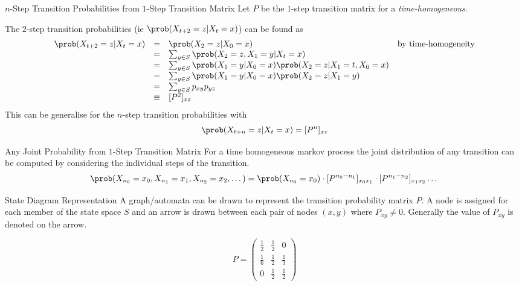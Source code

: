 \documentclass[11pt,a4paper]{article}
\begin{document}
  \begin{proposition}{$n$-Step Transition Probabilities from $1$-Step Transition Matrix}
    Let $P$ be the $1$-step transition matrix for a \textit{time-homogeneous}.

    \par The $2$-step transition probabilities (ie $\prob(X_{t+2}=z|X_t=x)$) can be found as
    \[\begin{array}{rcll}
      \prob(X_{t+2}=z|X_t=x)&=&\prob(X_2=z|X_0=x)&\text{by time-homogeneity}\\
      &=&\sum_{y\in S}\prob(X_2=z,X_1=y|X_t=x)\\
      &=&\sum_{y\in S}\prob(X_1=y|X_0=x)\prob(X_2=z|X_1=t,X_0=x)\\
      &=&\sum_{y\in S}\prob(X_1=y|X_0=x)\prob(X_2=z|X_1=y)\\
      &=&\sum_{y\in S}p_{xy}p_{yz}\\
      &\equiv&[P^2]_{xz}
    \end{array}\]
    This can be generalise for the $n$-step transition probabilities with
    \[ \prob(X_{t+n}=z|X_t=x)=[P^n]_{xz} \]
  \end{proposition}

  \begin{proposition}{Any Joint Probability from $1$-Step Transition Matrix}
    For a time homogeneous markov process the joint distribution of any transition can be computed by considering the individual steps of the transition.
    \[ \prob(X_{n_0}=x_0,X_{n_1}=x_1,X_{n_2}=x_2,\dots)=\prob(X_{n_0}=x_0)\cdot[P^{n_0-n_1}]_{x_0x_1}\cdot[P^{n_1-n_2}]_{x_1x_2}\dots \]
  \end{proposition}

  \begin{proposition}{State Diagram Representation}
    A graph/automata can be drawn to represent the transition probability matrix $P$. A node is assigned for each member of the state space $S$ and an arrow is drawn between each pair of nodes $(x,y)$ where $P_{xy}\neq0$. Generally the value of $P_{xy}$ is denoted on the arrow.
    \begin{center}
      \[P=\begin{pmatrix}\frac{1}{2}&\frac{1}{2}&0\\\frac{1}{6}&\frac{1}{2}&\frac{1}{3}\\0&\frac{1}{2}&\frac{1}{2}\end{pmatrix}\]
    \end{center}
  \end{proposition}
\end{document}
